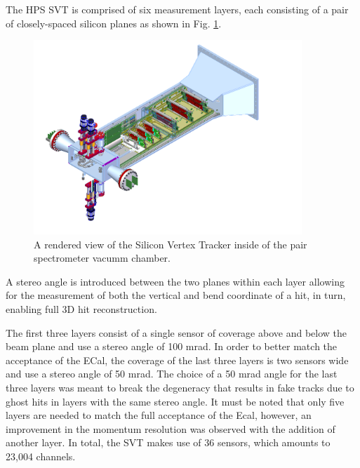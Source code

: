 The HPS SVT is comprised of six measurement layers, each consisting of a pair of
closely-spaced silicon planes as shown in Fig. \ref{fig:svt_layout_render}.
\begin{figure}[h]
    \centering
    \includegraphics[width=0.9\textwidth]{images/svt_layout_render.png}
    \caption{A rendered view of the Silicon Vertex Tracker inside of the pair
             spectrometer vacumm chamber.}
    \label{fig:svt_layout_render}
\end{figure}
A stereo angle is introduced between the two planes within each layer allowing
for the measurement of both the vertical and bend coordinate of a hit, in turn, 
enabling full 3D hit reconstruction.  

The first three layers consist of a single sensor of coverage above and below
the beam plane and use a stereo angle of 100 mrad. In order to better match the
acceptance of the ECal, the coverage of the last three layers is two sensors 
wide and use a stereo angle of 50 mrad.  The choice of a 50 mrad angle for the
last three layers was meant to break the degeneracy that results in fake tracks
due to ghost hits in layers with the same stereo angle.  It must be noted that
only five layers are needed to match the full acceptance of the Ecal, however,
an improvement in the momentum resolution was observed with the addition of 
another layer.  In total, the SVT makes use of 36 sensors, which amounts to 
23,004 channels.

